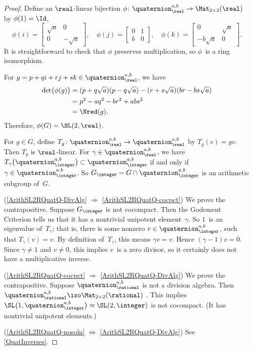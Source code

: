 \begin{proof}
  Define an $\real$-linear
bijection
 $\phi \colon \quaternion^{a,b}_\real \to \Mat_{2 \times 2}(\real)$
by $\phi(1) = \Id$,
 $$ 
  \phi(i) = 
 \begin{bmatrix}
 \sqrt{a} & 0 \\
 0 & -\sqrt{a}
 \end{bmatrix}
 , \quad
  \phi(j) = 
 \begin{bmatrix}
 0 & 1 \\
 b & 0
 \end{bmatrix}
 , \quad
  \phi(k) = 
 \begin{bmatrix}
 0 & \sqrt{a} \\
 -b\sqrt{a} & 0
 \end{bmatrix}
 .$$
 It is straightforward to check that $\phi$ preserves
multiplication, so $\phi$~is a ring isomorphism.

For $g = p + q i + r j + s k \in \quaternion^{a,b}_\real$, we have
 \begin{align*}
  \det \bigl( \phi(g) \bigr) 
 &= (p + q \sqrt{a})(p - q \sqrt{a})
 - (r + s\sqrt{a})(br - bs\sqrt{a})
 \\&= p^2 - a q^2 - b r^2 + ab s^2
 \\&= \Nred(g)
  . \end{align*}
 Therefore, $\phi(G) = \SL(2,\real)$.

 For $g \in G$, define $T_g
\colon \quaternion^{a,b}_\real \to \quaternion^{a,b}_\real$ by $T_g(v) = gv$.
Then $T_g$ is $\real$-linear. 
For $\gamma \in \quaternion^{a,b}_\real$, we have
$T_\gamma \bigl( \quaternion^{a,b}_\integer \bigr) \subset
\quaternion^{a,b}_\integer$ if and only if $\gamma \in
\quaternion^{a,b}_\integer$. So $G_{\integer} = G \cap
\quaternion^{a,b}_\integer$ is an arithmetic subgroup of~$G$.

(\ref{ArithSL2RQuatQ-DivAlg} $\Rightarrow$
\ref{ArithSL2RQuatQ-cocpct})
 We prove the contrapositive. Suppose $G_{\integer}$ is not
cocompact. Then the Godement Criterion  tells us that it has a nontrivial unipotent
element~$\gamma$. So $1$~is an
eigenvalue of~$T_\gamma$; that is, there is some nonzero $v
\in \quaternion^{a,b}_\integer$, such that $T_\gamma(v) = v$. By
definition of~$T_\gamma$, this means $\gamma v = v$. Hence
$(\gamma - 1) v = 0$. Since $\gamma \neq 1$ and $v \neq 0$,
this implies $v$~is a zero divisor, so it certainly does not have a multiplicative inverse.

(\ref{ArithSL2RQuatQ-cocpct} $\Rightarrow$
\ref{ArithSL2RQuatQ-DivAlg}) 
 We prove the contrapositive.
 Suppose $\quaternion^{a,b}_\rational$ is not a division algebra.
Then $\quaternion^{a,b}_\rational \iso \Mat_{2 \times 2}(\rational)$
. This implies $\SL \bigl( 1,
\quaternion^{a,b}_\integer \bigr) \approx \SL(2,\integer)$ is not
cocompact. (It has nontrivial unipotent elements.)

(\ref{ArithSL2RQuatQ-nosoln} $\Leftrightarrow$
\ref{ArithSL2RQuatQ-DivAlg}) See \cref{QuatInverses}.
 \end{proof}

